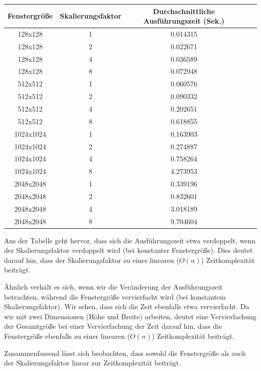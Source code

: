 \documentclass[course=erap]{aspdoc}
\begin{document}
\begin{table}[h]
\centering
\begin{tabular}{|c|c|c|c|c|}
\hline
\textbf{Fenstergröße} & \textbf{Skalierungsfaktor} & \textbf{Durchschnittliche Ausführungszeit (Sek.)}\\
\hline
128x128     & 1            & 0.014315 \\
128x128     & 2            & 0.022671 \\
128x128     & 4            & 0.036589 \\
128x128     & 8            & 0.072948 \\
\hline
512x512     & 1            & 0.060576 \\
512x512     & 2            & 0.090332 \\
512x512     & 4            & 0.202651 \\
512x512     & 8            & 0.618855 \\
\hline
1024x1024   & 1            & 0.163903 \\
1024x1024   & 2            & 0.274887 \\
1024x1024   & 4            & 0.758264 \\
1024x1024   & 8            & 4.273953 \\
\hline
2048x2048   & 1            & 0.339196 \\
2048x2048   & 2            & 0.832601 \\
2048x2048   & 4            & 3.018189 \\
2048x2048   & 8            & 9.704604 \\
\hline
\end{tabular}
\end{table}

Aus der Tabelle geht hervor, dass sich die Ausführungszeit etwa verdoppelt, wenn der Skalierungsfaktor verdoppelt wird (bei konstanter Fenstergröße). Dies deutet darauf hin, dass der Skalierungsfaktor zu einer linearen ($O(n)$) Zeitkomplexität beiträgt.

Ähnlich verhält es sich, wenn wir die Veränderung der Ausführungszeit betrachten, während die Fenstergröße vervierfacht wird (bei konstantem Skalierungsfaktor). Wir sehen, dass sich die Zeit ebenfalls etwa vervierfacht. Da wir mit zwei Dimensionen (Höhe und Breite) arbeiten, deutet eine Vervierfachung der Gesamtgröße bei einer Vervierfachung der Zeit darauf hin, dass die Fenstergröße ebenfalls zu einer linearen ($O(n)$) Zeitkomplexität beiträgt.

Zusammenfassend lässt sich beobachten, dass sowohl die Fenstergröße als auch der Skalierungsfaktor linear zur Zeitkomplexität beiträgt. 
\end{document}
